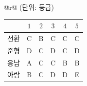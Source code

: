 {\renewcommand{\arraystretch}{1.35}\small
\begin{tabular}{@{}r@{}}
{\footnotesize (단위: 등급)} \\[1pt]
\begin{tabular}{|c|c|c|c|c|c|}
\hline
\begin{tikzpicture}[baseline=(c.base)]
  \node[inner sep=0pt, minimum width=1.5cm, minimum height=0.8cm] (c) {};
  \draw[line width=0.3pt] (c.north west) -- (c.south east);
  \node[font=\small, anchor=north east, inner sep=1.5pt] at (c.north east) {회};
  \node[font=\small, anchor=south west, inner sep=1.5pt] at (c.south west) {학생};
\end{tikzpicture} & $1$ & $2$ & $3$ & $4$ & $5$ \\ \hline
선환 & C & B & C & C & C \\ \hline
준형 & D & C & D & C & D \\ \hline
응남 & A & C & C & B & B \\ \hline
아람 & B & C & D & D & E \\ \hline
\end{tabular}
\end{tabular}}
